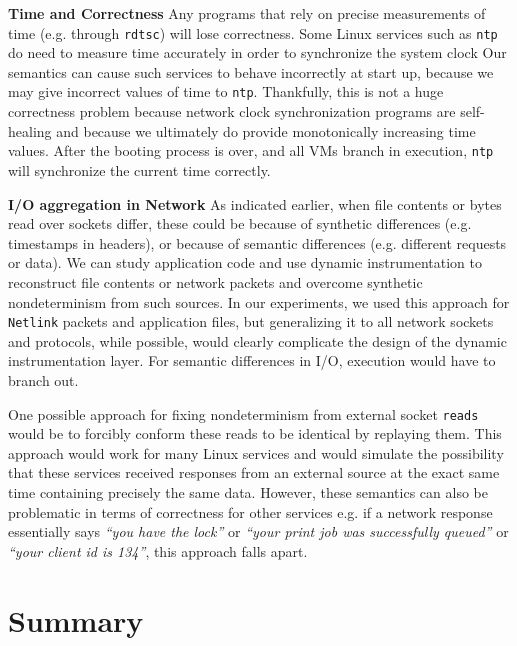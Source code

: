 \noindent \textbf{Time and Correctness} \newline
Any programs that rely on precise
measurements of time (e.g. through \texttt{rdtsc})
will lose correctness. 
Some Linux services such as \texttt{ntp} 
do need to measure time accurately in order to synchronize the system clock
Our semantics can cause such services to 
behave incorrectly at start up,
because we may give incorrect values
of time to \texttt{ntp}.
Thankfully, this is not a huge correctness problem because network 
clock synchronization programs are self-healing and
because we ultimately do provide monotonically
 increasing time values. After the booting process is over,
and all VMs branch in execution, \texttt{ntp} will synchronize
the current time correctly. \newline

\noindent \textbf{I/O aggregation in Network} \newline
As indicated earlier, when file contents
or bytes read over sockets differ, 
these could be because of synthetic differences (e.g.
timestamps in headers), or because of 
semantic differences (e.g. different requests or data).
We can study application code and use dynamic instrumentation
to reconstruct file contents or network packets and overcome synthetic nondeterminism
from such sources. In our experiments, we used this approach
for \texttt{Netlink} packets and application files, but generalizing it
to all network sockets and protocols, while possible, would clearly
complicate the design of the dynamic instrumentation
layer. For semantic differences in I/O, 
execution would have to branch out.

One possible approach for fixing nondeterminism from external
socket \texttt{reads} would be to forcibly
conform these reads to be identical by replaying
them. This approach would work for many 
Linux services and would simulate the possibility
that these services received responses from
an external source at the exact same time containing
precisely the same data. However, these semantics can
also be problematic in terms of correctness for other services
e.g. if a network 
response essentially says {\em ``you have the lock''} or 
{\em ``your print job was successfully queued''} or
{\em ``your client id is 134''},
this approach falls apart.


\section {Summary}
